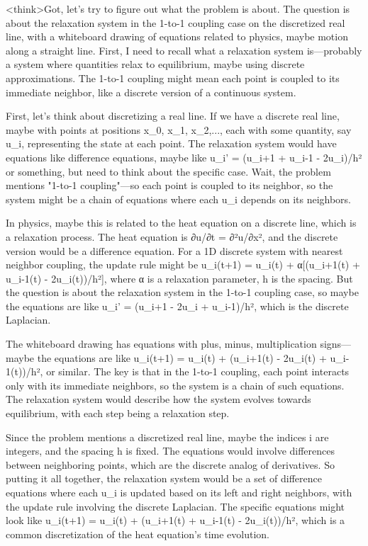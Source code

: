 <think>Got, let's try to figure out what the problem is about. The question is about the relaxation system in the 1-to-1 coupling case on the discretized real line, with a whiteboard drawing of equations related to physics, maybe motion along a straight line. First, I need to recall what a relaxation system is—probably a system where quantities relax to equilibrium, maybe using discrete approximations. The 1-to-1 coupling might mean each point is coupled to its immediate neighbor, like a discrete version of a continuous system.

First, let's think about discretizing a real line. If we have a discrete real line, maybe with points at positions x_0, x_1, x_2,..., each with some quantity, say u_i, representing the state at each point. The relaxation system would have equations like difference equations, maybe like u_i' = (u_{i+1} + u_{i-1} - 2u_i)/h² or something, but need to think about the specific case. Wait, the problem mentions "1-to-1 coupling"—so each point is coupled to its neighbor, so the system might be a chain of equations where each u_i depends on its neighbors. 

In physics, maybe this is related to the heat equation on a discrete line, which is a relaxation process. The heat equation is ∂u/∂t = ∂²u/∂x², and the discrete version would be a difference equation. For a 1D discrete system with nearest neighbor coupling, the update rule might be u_i(t+1) = u_i(t) + α[(u_{i+1}(t) + u_{i-1}(t) - 2u_i(t))/h²], where α is a relaxation parameter, h is the spacing. But the question is about the relaxation system in the 1-to-1 coupling case, so maybe the equations are like u_i' = (u_{i+1} - 2u_i + u_{i-1})/h², which is the discrete Laplacian. 

The whiteboard drawing has equations with plus, minus, multiplication signs—maybe the equations are like u_i(t+1) = u_i(t) + (u_{i+1}(t) - 2u_i(t) + u_{i-1}(t))/h², or similar. The key is that in the 1-to-1 coupling, each point interacts only with its immediate neighbors, so the system is a chain of such equations. The relaxation system would describe how the system evolves towards equilibrium, with each step being a relaxation step. 

Since the problem mentions a discretized real line, maybe the indices i are integers, and the spacing h is fixed. The equations would involve differences between neighboring points, which are the discrete analog of derivatives. So putting it all together, the relaxation system would be a set of difference equations where each u_i is updated based on its left and right neighbors, with the update rule involving the discrete Laplacian. The specific equations might look like u_i(t+1) = u_i(t) + (u_{i+1}(t) + u_{i-1}(t) - 2u_i(t))/h², which is a common discretization of the heat equation's time evolution. 


